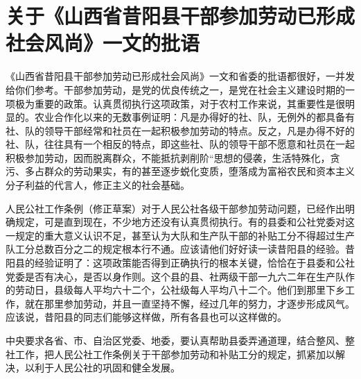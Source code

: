 \section[关于《山西省昔阳县干部参加劳动已形成社会风尚》一文的批语（一九六三年五月）]{关于《山西省昔阳县干部参加劳动已形成社会风尚》一文的批语}


《山西省昔阳县干部参加劳动已形成社会风尚》一文和省委的批语都很好，一并发给你们参考。干部参加劳动，是党的优良传统之一，是党在社会主义建设时期的一项极为重要的政策。认真贯彻执行这项政策，对于农村工作来说，其重要性是很明显的。农业合作化以来的无数事例证明：凡是办得好的社、队，无例外的都具备有社、队的领导干部经常和社员在一起积极参加劳动的特点。反之，凡是办得不好的社、队，往往具有一个相反的特点，即这些社、队的领导干部不愿意和社员在一起积极参加劳动，因而脱离群众，不能抵抗剥削阶“思想的侵袭，生活特殊化，贪污、多占群众的劳动果实，有的甚至逐步蜕化变质，堕落成为富裕农民和资本主义分子利益的代言人，修正主义的社会基础。

人民公社工作条例（修正草案）对于人民公社各级干部参加劳动问题，已经作出明确规定，可是直到现在，不少地方还没有认真贯彻执行。有的县委和公社党委对这一规定的重大意义认识不足，甚至认为大队和生产队干部的补贴工分不得超过生产队工分总数百分之二的规定根本行不通。应该请他们好好读一读昔阳县的经验。昔阳县的经验证明了：这项政策能否得到正确执行的根本关键，恰恰在于县委和公社党委是否有决心，是否以身作则。这个县的县、社两级干部一九六二年在生产队作的劳动日，县级每人平均六十二个，公社级每人平均八十二个。他们到那里下乡工作，就在那里参加劳动，并且一直坚持不懈，经过几年的努力，才逐步形成风气。应该说，昔阳县的同志们能够这样做，所有各县也可以这样做的。

中央要求各省、市、自治区党委、地委，要认真帮助县委弄通道理，结合整风、整社工作，把人民公社工作条例关于干部参加劳动和补贴工分的规定，抓紧加以解决，以利于人民公社的巩固和健全发展。

